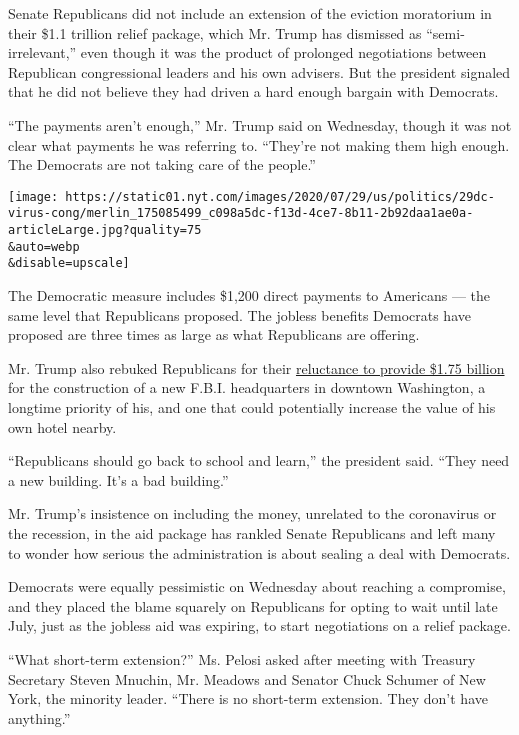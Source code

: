 Senate Republicans did not include an extension of the eviction
moratorium in their \$1.1 trillion relief package, which Mr. Trump has
dismissed as ``semi-irrelevant,'' even though it was the product of
prolonged negotiations between Republican congressional leaders and his
own advisers. But the president signaled that he did not believe they
had driven a hard enough bargain with Democrats.

``The payments aren't enough,'' Mr. Trump said on Wednesday, though it
was not clear what payments he was referring to. ``They're not making
them high enough. The Democrats are not taking care of the people.''

\texttt{[image: https://static01.nyt.com/images/2020/07/29/us/politics/29dc-virus-cong/merlin\_175085499\_c098a5dc-f13d-4ce7-8b11-2b92daa1ae0a-articleLarge.jpg?quality=75\\\&auto=webp\\\&disable=upscale]}

The Democratic measure includes \$1,200 direct payments to Americans ---
the same level that Republicans proposed. The jobless benefits Democrats
have proposed are three times as large as what Republicans are offering.

Mr. Trump also rebuked Republicans for their
\href{https://www.nytimes.com/2020/07/28/us/politics/republicans-trump-fbi-building-virus-relief-bill.html}{reluctance
to provide \$1.75 billion} for the construction of a new F.B.I.
headquarters in downtown Washington, a longtime priority of his, and one
that could potentially increase the value of his own hotel nearby.

``Republicans should go back to school and learn,'' the president said.
``They need a new building. It's a bad building.''

Mr. Trump's insistence on including the money, unrelated to the
coronavirus or the recession, in the aid package has rankled Senate
Republicans and left many to wonder how serious the administration is
about sealing a deal with Democrats.

Democrats were equally pessimistic on Wednesday about reaching a
compromise, and they placed the blame squarely on Republicans for opting
to wait until late July, just as the jobless aid was expiring, to start
negotiations on a relief package.

``What short-term extension?'' Ms. Pelosi asked after meeting with
Treasury Secretary Steven Mnuchin, Mr. Meadows and Senator Chuck Schumer
of New York, the minority leader. ``There is no short-term extension.
They don't have anything.''

